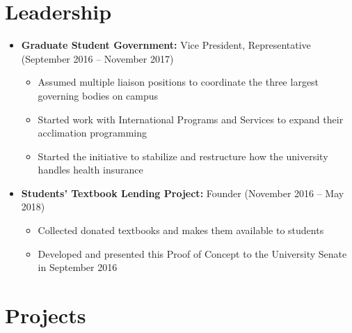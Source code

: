 \documentclass[10pt,a4paper,sans]{moderncv}        %
\begin{document}
\vspace{2pt}


\section{Leadership}

\vspace{6pt}

\begin{itemize}

\item \textbf{Graduate Student Government:} Vice President, Representative (September 2016 -- November 2017)
\begin{itemize}
	\item Assumed multiple liaison positions to coordinate the three largest governing bodies on campus
	\item Started work with International Programs and Services to expand their acclimation programming
	\item Started the initiative to stabilize and restructure how the university handles health insurance
\end{itemize}

\vspace{6pt}

\item \textbf{Students' Textbook Lending Project:} Founder (November 2016 -- May 2018)
\begin{itemize}
	\item Collected donated textbooks and makes them available to students
	\item Developed and presented this Proof of Concept to the University Senate in September 2016
\end{itemize}

\end{itemize}


\vspace{2pt}

\section{Projects}

\vspace{5pt}
\end{document}
